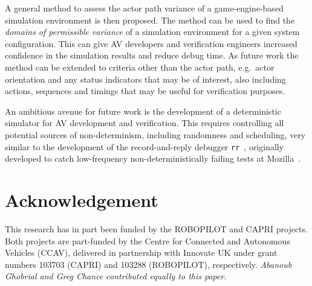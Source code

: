 \documentclass[runningheads,twocolumn,a4paper,10pt]{llncs}
\begin{document}
A general method to assess the actor path variance of a game-engine-based simulation environment is then proposed. The method can be used to find the \textit{domains of permissible variance} of a simulation environment for a given system configuration. This can give AV developers and verification engineers increased confidence in the simulation results and reduce debug time. 
% 
%
As future work the method can be extended to criteria other than the actor path, e.g.\ actor orientation and any status indicators that may be of interest, also including actions, sequences and timings that may be useful for verification purposes.

An ambitious avenue for future work is the development of a deterministic simulator for AV development and verification. This requires controlling all potential sources of non-determinism, including randomness and scheduling, very similar to the development of the record-and-reply debugger \texttt{rr}~\cite{RR_link}, originally developed to catch low-frequency non-deterministically failing tests at Mozilla~\cite{acm-q-rr-interview}.


\section*{Acknowledgement}
This research has in part been funded by the ROBOPILOT and CAPRI projects. Both projects are part-funded by the Centre for Connected and Autonomous Vehicles (CCAV), delivered in partnership with Innovate UK under grant numbers 103703 (CAPRI) and 103288 (ROBOPILOT), respectively.
%
\textit{Abanoub Ghobrial and Greg Chance contributed equally to this paper.}


\end{document}

